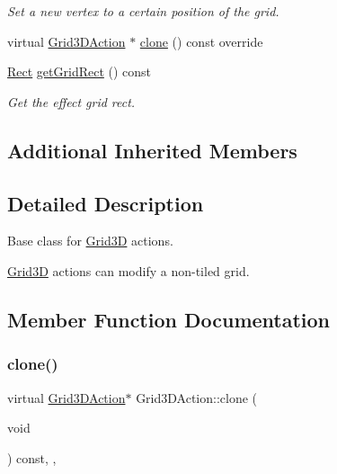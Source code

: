 \begin{DoxyCompactItemize}
\begin{DoxyCompactList}\small\item\em Set a new vertex to a certain position of the grid. \end{DoxyCompactList}\item 
virtual \hyperlink{classGrid3DAction}{Grid3\+D\+Action} $\ast$ \hyperlink{classGrid3DAction_a01d5b2d60654ef66d6551ac2190ed14c}{clone} () const override
\item 
\hyperlink{classRect}{Rect} \hyperlink{classGrid3DAction_a5e488a9ee6a5605725f01a8a30a55975}{get\+Grid\+Rect} () const
\begin{DoxyCompactList}\small\item\em Get the effect grid rect. \end{DoxyCompactList}\end{DoxyCompactItemize}
\subsection*{Additional Inherited Members}


\subsection{Detailed Description}
Base class for \hyperlink{classGrid3D}{Grid3D} actions. 

\hyperlink{classGrid3D}{Grid3D} actions can modify a non-\/tiled grid. 

\subsection{Member Function Documentation}
\mbox{\label{classGrid3DAction_a01d5b2d60654ef66d6551ac2190ed14c}} 
\subsubsection{\texorpdfstring{clone()}{clone()}\hspace{0.1cm}{\footnotesize\ttfamily [1/2]}}
{\footnotesize\ttfamily virtual \hyperlink{classGrid3DAction}{Grid3\+D\+Action}$\ast$ Grid3\+D\+Action\+::clone (\begin{DoxyParamCaption}\item[{void}]{ }\end{DoxyParamCaption}) const\hspace{0.3cm}{\ttfamily [inline]}, {\ttfamily [override]}, {\ttfamily [virtual]}}

